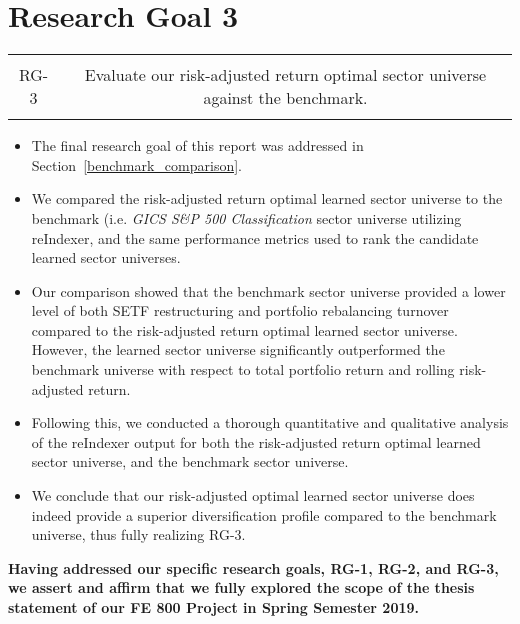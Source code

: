 \documentclass[../main.tex]{subfiles}
\begin{document}
\section{Research Goal 3}

\begin{table}[h!]
    \centering
    \begin{tabular}{| c | c |}
        \hline
        &  \\
        RG-3 & Evaluate our risk-adjusted return optimal sector universe against the benchmark. \\
        & \\
        \hline
    \end{tabular}
\end{table}

\begin{itemize}
    \item The final research goal of this report was addressed in Section~\ref{benchmark_comparison}.
    \item We compared the risk-adjusted return optimal learned sector universe to the benchmark (i.e. \textit{GICS S\&P 500 Classification} sector universe utilizing reIndexer, and the same performance metrics used to rank the candidate learned sector universes.
    \item Our comparison showed that the benchmark sector universe provided a lower level of both SETF restructuring and portfolio rebalancing turnover compared to the risk-adjusted return optimal learned sector universe. However, the learned sector universe significantly outperformed the benchmark universe with respect to total portfolio return and rolling risk-adjusted return.
    \item Following this, we conducted a thorough quantitative and qualitative analysis of the reIndexer output for both the risk-adjusted return optimal learned sector universe, and the benchmark sector universe.
    \item We conclude that our risk-adjusted optimal learned sector universe does indeed provide a superior diversification profile compared to the benchmark universe, thus fully realizing RG-3.
\end{itemize}

\vspace*{\fill}

\begin{center}
    \bfseries Having addressed our specific research goals, RG-1, RG-2, and RG-3, we assert and affirm that we fully explored the scope of the thesis statement of our FE 800 Project in Spring Semester 2019.
\end{center}

\vspace*{\fill}
\end{document}
